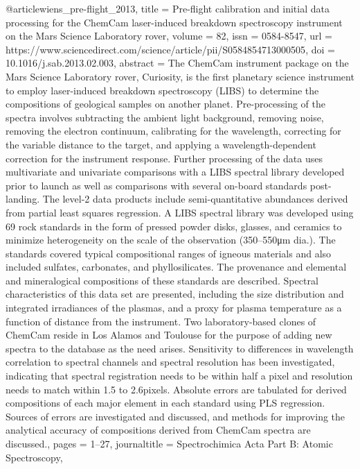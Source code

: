 @article{wiens_pre-flight_2013,
	title = {Pre-flight calibration and initial data processing for the {ChemCam} laser-induced breakdown spectroscopy instrument on the Mars Science Laboratory rover},
	volume = {82},
	issn = {0584-8547},
	url = {https://www.sciencedirect.com/science/article/pii/S0584854713000505},
	doi = {10.1016/j.sab.2013.02.003},
	abstract = {The {ChemCam} instrument package on the Mars Science Laboratory rover, Curiosity, is the first planetary science instrument to employ laser-induced breakdown spectroscopy ({LIBS}) to determine the compositions of geological samples on another planet. Pre-processing of the spectra involves subtracting the ambient light background, removing noise, removing the electron continuum, calibrating for the wavelength, correcting for the variable distance to the target, and applying a wavelength-dependent correction for the instrument response. Further processing of the data uses multivariate and univariate comparisons with a {LIBS} spectral library developed prior to launch as well as comparisons with several on-board standards post-landing. The level-2 data products include semi-quantitative abundances derived from partial least squares regression. A {LIBS} spectral library was developed using 69 rock standards in the form of pressed powder disks, glasses, and ceramics to minimize heterogeneity on the scale of the observation (350–550μm dia.). The standards covered typical compositional ranges of igneous materials and also included sulfates, carbonates, and phyllosilicates. The provenance and elemental and mineralogical compositions of these standards are described. Spectral characteristics of this data set are presented, including the size distribution and integrated irradiances of the plasmas, and a proxy for plasma temperature as a function of distance from the instrument. Two laboratory-based clones of {ChemCam} reside in Los Alamos and Toulouse for the purpose of adding new spectra to the database as the need arises. Sensitivity to differences in wavelength correlation to spectral channels and spectral resolution has been investigated, indicating that spectral registration needs to be within half a pixel and resolution needs to match within 1.5 to 2.6pixels. Absolute errors are tabulated for derived compositions of each major element in each standard using {PLS} regression. Sources of errors are investigated and discussed, and methods for improving the analytical accuracy of compositions derived from {ChemCam} spectra are discussed.},
	pages = {1--27},
	journaltitle = {Spectrochimica Acta Part B: Atomic Spectroscopy},
}
